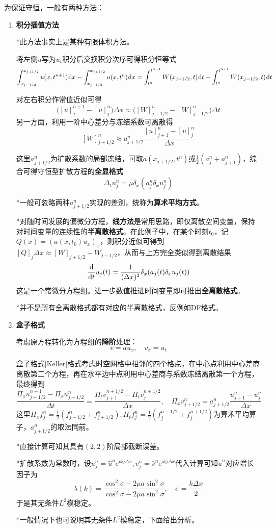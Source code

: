\documentclass[a4paper,UTF8,fontset=windows]{ctexart}
\newcommand*{\dr}{\hspace{0.07em}\mathrm{d}}
\begin{document}
为保证守恒，一般有两种方法：
\begin{enumerate}
    \item \textbf{积分插值方法}
    
    *此方法事实上是某种有限体积方法。

    将左侧$u$写为$u_t$积分后交换积分次序可得积分恒等式
    $$\int_{x_{j-1/2}}^{x_{j+1/2}}u(x,t^{n+1})\dr x-\int_{x_{j-1/2}}^{x_{j+1/2}}u(x,t^n)\dr x=\int_{t^n}^{t^{n+1}}W(x_{j+1/2},t)\dr t-\int_{t^n}^{t^{n+1}}W(x_{j-1/2},t)\dr t$$

    对左右积分作常值近似可得
    $$\big([u]_j^{n+1}-[u]_j^n\big)\Delta x\approx\big([W]_{j+1/2}^n-[W]_{j-1/2}^n\big)\Delta t$$
    另一方面，利用一阶中心差分与冻结系数可离散得
    $$[W]_{j+1/2}^n\approx a_{j+1/2}^n\frac{[u]_{j+1}^n-[u]_j^n}{\Delta x}$$

    这里$a_{j+1/2}^n$为扩散系数的局部冻结，可取$a(x_{j+1/2},t^n)$或$\frac{1}{2}(a_j^n+a_{j+1}^n)$，综合可得守恒型扩散方程的\textbf{全显格式}
    $$\Delta_tu_j^n=\mu\delta_x(a_j^n\delta_xu_j^n)$$

    *一般可忽略两种$a_{j+1/2}^n$实现的差别，统称为\textbf{算术平均方式}。

    *对随时间发展的偏微分方程，\textbf{线方法}是常用思路，即仅离散空间变量，保持对时间变量的连续性的\textbf{半离散格式}。在此例子中，在某个时刻$t_0$，记$Q(x)=(a(x,t_0)u_x)_x$，则积分近似可得到$[Q]_j\Delta x\approx[W]_{j+1/2}-W_{j-1/2}$，从而与上方完全类似得到离散结果
    $$\frac{\dr}{\dr t}u_j(t)=\frac{1}{(\Delta x)^2}\delta_x(a_j(t)\delta_xu_j(t))$$
    这是一个常微分方程组。进一步数值推进时间变量即可推出\textbf{全离散格式}。

    *并不是所有全离散格式都有对应的半离散格式，反例如DF格式。

    \item \textbf{盒子格式}

    考虑原方程转化为方程组的\textbf{降阶}处理：
    $$v=au_x,\quad v_x=u_t$$

    盒子格式[Keller]格式考虑时空网格中相邻的四个格点，在中心点利用中心差商离散第二个方程，再在水平边中点利用中心差商与系数冻结离散第一个方程，最终得到
    $$\frac{\Pi_xu_{j+1/2}^{n+1}-\Pi_xu_{j+1/2}^n}{\Delta t}=\frac{\Pi_tv_{j+1}^{n+1/2}-\Pi_tv_j^{n+1/2}}{\Delta x},\quad\Pi_xv_{j+1/2}^n=a_{j+1/2}^n\frac{u_{j+1}^n-u_j^n}{\Delta x}$$
    这里$\Pi_xf_j^n=\frac{1}{2}(f_{j-1/2}^n+f_{j+1/2}^n),\Pi_tf_j^n=\frac{1}{2}(f_j^{n-1/2}+f_j^{n+1/2})$为算术平均算子，$a_{j+1/2}^n$的取法同前。

    *直接计算可知其具有$(2,2)$阶局部截断误差。

    *扩散系数为常数时，设$u_j^n=\hat{u}^n\mathrm{e}^{\mathrm{i}kj\Delta x},v_j^n=\hat{v}^n\mathrm{e}^{\mathrm{i}kj\Delta x}$代入计算可知$\hat{u}^n$对应增长因子为
    $$\lambda(k)=\frac{\cos^2\sigma-2\mu a\sin^2\sigma}{\cos^2\sigma-2\mu a\sin^2\sigma},\quad\sigma=\frac{k\Delta x}{2}$$
    于是其无条件$L^2$模稳定。

    *一般情况下也可说明其无条件$L^2$模稳定，下面给出分析。
\end{enumerate}
\end{document}

